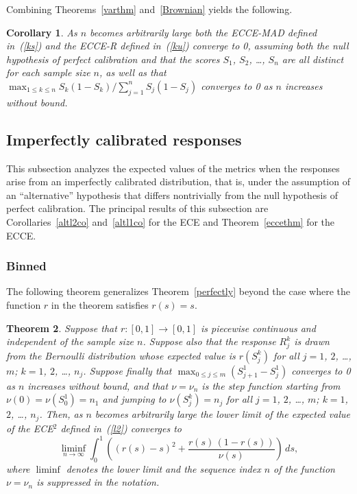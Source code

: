 \documentclass{article}
\newtheorem{theorem}{Theorem}[]
\newtheorem{corollary}[theorem]{Corollary}
\begin{document}
Combining Theorems~\ref{varthm} and~\ref{Brownian} yields the following.

\begin{corollary}
\label{ecceco}
As $n$ becomes arbitrarily large both the ECCE-MAD defined in~(\ref{ks})
and the ECCE-R defined in~(\ref{ku}) converge to 0,
assuming both the null hypothesis of perfect calibration
and that the scores $S_1$, $S_2$, \dots, $S_n$ are all distinct
for each sample size $n$, as well as that
$\max_{1 \le k \le n} S_k (1 - S_k) / \sum_{j=1}^n S_j (1 - S_j)$
converges to 0 as $n$ increases without bound.
\end{corollary}


\subsection{Imperfectly calibrated responses}
\label{imperfectsub}

This subsection analyzes the expected values of the metrics when the responses
arise from an imperfectly calibrated distribution, that is,
under the assumption of an ``alternative'' hypothesis that differs
nontrivially from the null hypothesis of perfect calibration.
The principal results of this subsection
are Corollaries~\ref{altl2co} and~\ref{altl1co} for the ECE
and Theorem~\ref{eccethm} for the ECCE.

\subsubsection{Binned}

The following theorem generalizes Theorem~\ref{perfectly}
beyond the case where the function $r$ in the theorem satisfies $r(s) = s$.

\begin{theorem}
\label{imperfectly}
Suppose that $r : [0, 1] \to [0, 1]$ is piecewise continuous
and independent of the sample size $n$.
Suppose also that the response $R_j^k$ is drawn from the Bernoulli distribution
whose expected value is $r(S_j^k)$ for all $j = 1$, $2$, \dots, $m$;
$k = 1$, $2$, \dots, $n_j$.
Suppose finally that $\max_{0 \le j \le m} (S_{j+1}^1 - S_j^1)$ converges to 0
as $n$ increases without bound,
and that $\nu = \nu_n$ is the step function
starting from $\nu(0) = \nu(S_0^1) = n_1$ and jumping to $\nu(S_j^k) = n_j$
for all $j = 1$, $2$, \dots, $m$; $k = 1$, $2$, \dots, $n_j$.
Then, as $n$ becomes arbitrarily large
the lower limit of the expected value of the ECE$^2$ defined in~(\ref{l2})
converges to
%
\begin{equation}
\label{lowerbound2}
\liminf_{n \to \infty} \int_0^1
\left( (r(s) - s)^2 + \frac{r(s) \, (1 - r(s))}{\nu(s)} \right) \, ds,
\end{equation}
%
where $\liminf$ denotes the lower limit and the sequence index $n$
of the function $\nu = \nu_n$ is suppressed in the notation.
\end{theorem}
\end{document}

